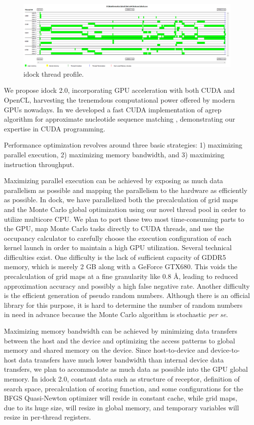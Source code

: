 \begin{figure}
\centering
\includegraphics[width=\textwidth]{idock/ThreadProfile.png}
\caption{idock thread profile.}
\label{idock:ThreadProfile}
\end{figure}

We propose idock 2.0, incorporating GPU acceleration with both CUDA and OpenCL, harvesting the trenemdous computational power offered by modern GPUs nowadays. In \citeyear{1138} we developed a fast CUDA implementation of agrep algorithm for approximate nucleotide sequence matching \citep{1138}, demonstrating our expertise in CUDA programming.

Performance optimization revolves around three basic strategies: 1) maximizing parallel execution, 2) maximizing memory bandwidth, and 3) maximizing instruction throughput.

Maximizing parallel execution can be achieved by exposing as much data parallelism as possible and mapping the parallelism to the hardware as efficiently as possible. In dock, we have parallelized both the precalculation of grid maps and the Monte Carlo global optimization using our novel thread pool in order to utilize multicore CPU. We plan to port these two most time-consuming parts to the GPU, map Monte Carlo tasks directly to CUDA threads, and use the occupancy calculator to carefully choose the execution configuration of each kernel launch in order to maintain a high GPU utilization. Several technical difficulties exist. One difficulty is the lack of sufficient capacity of GDDR5 memory, which is merely 2 GB along with a GeForce GTX680. This voids the precalculation of grid maps at a fine granularity like 0.8 \AA, leading to reduced approximation accuracy and possibly a high false negative rate. Another difficulty is the efficient generation of pseudo random numbers. Although there is an official library for this purpose, it is hard to determine the number of random numbers in need in advance because the Monte Carlo algorithm is stochastic \textit{per se}.

Maximizing memory bandwidth can be achieved by minimizing data transfers between the host and the device and optimizing the access patterns to global memory and shared memory on the device. Since host-to-device and device-to-host data transfers have much lower bandwidth than internal device data transfers, we plan to accommodate as much data as possible into the GPU global memory. In idock 2.0, constant data such as structure of receptor, definition of search space, precalculation of scoring function, and some configurations for the BFGS Quasi-Newton optimizer will reside in constant cache, while grid maps, due to its huge size, will resize in global memory, and temporary variables will resize in per-thread registers.

